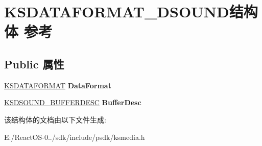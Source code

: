 \hypertarget{struct_k_s_d_a_t_a_f_o_r_m_a_t___d_s_o_u_n_d}{}\section{K\+S\+D\+A\+T\+A\+F\+O\+R\+M\+A\+T\+\_\+\+D\+S\+O\+U\+N\+D结构体 参考}
\label{struct_k_s_d_a_t_a_f_o_r_m_a_t___d_s_o_u_n_d}
\subsection*{Public 属性}
\begin{DoxyCompactItemize}
\item 
\mbox{\label{struct_k_s_d_a_t_a_f_o_r_m_a_t___d_s_o_u_n_d_a745f3f557f08fd65876537427a45ab1c}} 
\hyperlink{struct_k_s_d_a_t_a_f_o_r_m_a_t}{K\+S\+D\+A\+T\+A\+F\+O\+R\+M\+AT} {\bfseries Data\+Format}
\item 
\mbox{\label{struct_k_s_d_a_t_a_f_o_r_m_a_t___d_s_o_u_n_d_ad15564b721dfe47da17c7d8eeb8f17b2}} 
\hyperlink{struct_k_s_d_s_o_u_n_d___b_u_f_f_e_r_d_e_s_c}{K\+S\+D\+S\+O\+U\+N\+D\+\_\+\+B\+U\+F\+F\+E\+R\+D\+E\+SC} {\bfseries Buffer\+Desc}
\end{DoxyCompactItemize}


该结构体的文档由以下文件生成\+:\begin{DoxyCompactItemize}
\item 
E\+:/\+React\+O\+S-\/0../sdk/include/psdk/ksmedia.\+h\end{DoxyCompactItemize}
